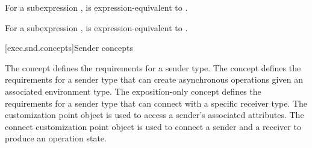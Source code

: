 \pnum
For a subexpression ,
is expres\-sion-equivalent to .

\pnum
For a subexpression ,
is expression-equivalent to .

[exec.snd.concepts]{Sender concepts}

\pnum
The  concept defines
the requirements for a sender type.
The  concept defines
the requirements for a sender type
that can create asynchronous operations given an associated environment type.
The exposition-only concept  defines
the requirements for a sender type
that can connect with a specific receiver type.
The  customization point object is used to access
a sender's associated attributes.
The connect customization point object is used to connect
a sender and a receiver to produce an operation state.

